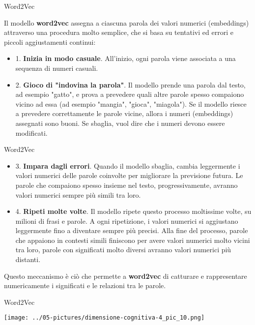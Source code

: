 \documentclass[aspectratio=169]{beamer}
\begin{document}
\begin{frame}{Word2Vec}

Il modello \textbf{word2vec} assegna a ciascuna parola dei valori numerici (embeddings) attraverso una procedura molto semplice, che si basa su tentativi ed errori e piccoli aggiustamenti continui:
\begin{itemize}
\item 1. \textbf{Inizia in modo casuale}. All’inizio, ogni parola viene associata a una sequenza di numeri casuali.

\item 2. \textbf{Gioco di "indovina la parola"}. Il modello prende una parola dal testo, ad esempio "gatto", e prova a prevedere quali altre parole spesso compaiono vicino ad essa (ad esempio "mangia", "gioca", "miagola"). Se il modello riesce a prevedere correttamente le parole vicine, allora i numeri (embeddings) assegnati sono buoni. Se sbaglia, vuol dire che i numeri devono essere modificati.
\end{itemize}
\end{frame}
%
%
\begin{frame}{Word2Vec}
\begin{itemize}
\item 3. \textbf{Impara dagli errori}. Quando il modello sbaglia, cambia leggermente i valori numerici delle parole coinvolte per migliorare la previsione futura. Le parole che compaiono spesso insieme nel testo, progressivamente, avranno valori numerici sempre più simili tra loro.

\item 4. \textbf{Ripeti molte volte}. Il modello ripete questo processo moltissime volte, su milioni di frasi e parole. A ogni ripetizione, i valori numerici si aggiustano leggermente fino a diventare sempre più precisi. Alla fine del processo, parole che appaiono in contesti simili finiscono per avere valori numerici molto vicini tra loro, parole con significati molto diversi avranno valori numerici più distanti.
\end{itemize}
\vspace{0.5cm}
Questo meccanismo è ciò che permette a \textbf{word2vec} di catturare e rappresentare numericamente i significati e le relazioni tra le parole.

\end{frame}
%
%
\begin{frame}{Word2Vec}
\begin{center}
\texttt{[image: ../05-pictures/dimensione-cognitiva-4\_pic\_10.png]} 
\end{center}
\end{frame}
\end{document}
